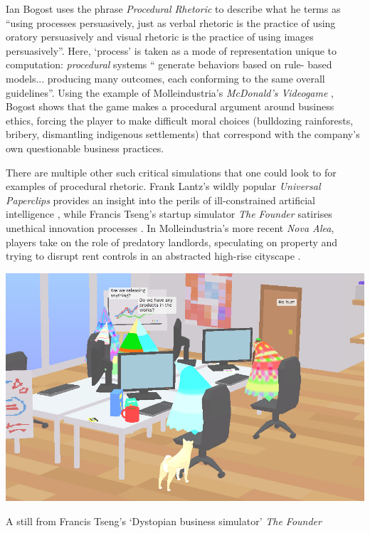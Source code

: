 \documentclass[nofonts,nols,justified,nobib]{tufte-book}
\begin{document}
Ian Bogost uses the phrase \emph{Procedural Rhetoric} to describe what he terms as ``using processes persuasively,  just as verbal rhetoric is the practice of using oratory persuasively and visual rhetoric is the practice of using images persuasively''. Here, `process' is taken as a mode of representation unique to computation: \emph{procedural} systems `` generate behaviors based on rule- based models... producing many outcomes, each conforming to the same overall guidelines''. Using the example of Molleindustria's \emph{McDonald's Videogame} \cite{molleindustria_mcdonalds_2006}, Bogost shows that the game makes a procedural argument around business ethics, forcing the player to make difficult moral choices (bulldozing rainforests, bribery, dismantling indigenous settlements) that correspond with the company's own questionable business practices. \cite{bogost_rhetoric_2008}

There are multiple other such critical simulations that one could look to for examples of procedural rhetoric. Frank Lantz's wildly popular \emph{Universal Paperclips} provides an insight into the perils of ill-constrained artificial intelligence \cite{lantz_universal_2017}, while Francis Tseng's startup simulator \emph{The Founder} satirises unethical innovation processes \cite{tseng_founder_2017}. In Molleindustria's more recent \emph{Nova Alea}, players take on the role of predatory landlords, speculating on property and trying to disrupt rent controls in an abstracted high-rise cityscape \cite{molleindustria_nova_2016}.

\begin{marginfigure}
\includegraphics[width=\textwidth]{img/1/the-founder.jpg}
\caption{A still from Francis Tseng's `Dystopian business simulator' \emph{The Founder} \cite{tseng_founder_2017-1}}
\end{marginfigure}
\end{document}

